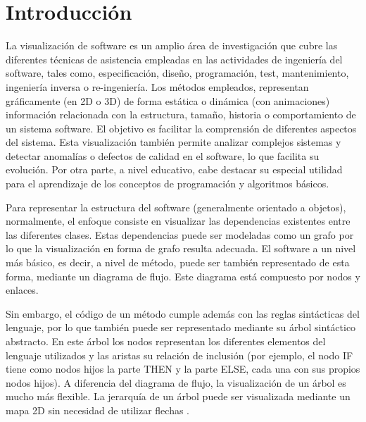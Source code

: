 \documentclass{llncs}
\begin{document}
\section{Introducción}
\label{sec:intro}
La visualización de software es un amplio área de investigación que cubre las diferentes técnicas de asistencia empleadas en las actividades de ingeniería del software, tales como, especificación, diseño, programación, test, mantenimiento, ingeniería inversa o re-ingeniería. Los métodos empleados, representan gráficamente (en 2D o 3D) de forma estática o dinámica (con animaciones) información relacionada con la estructura, tamaño, historia o comportamiento de un sistema software. El objetivo es facilitar la comprensión de diferentes aspectos del sistema. Esta visualización también permite analizar complejos sistemas y detectar anomalías o defectos de calidad en el software, lo que facilita su evolución. Por otra parte, a nivel educativo, cabe destacar su especial utilidad para el aprendizaje de los conceptos de programación y algoritmos básicos.

Para representar la estructura del software (generalmente orientado a objetos), normalmente, el enfoque consiste en visualizar las dependencias existentes entre las diferentes clases. Estas dependencias puede ser modeladas como un grafo por lo que la visualización en forma de grafo resulta adecuada. El software a un nivel más básico, es decir, a nivel de método, puede ser también representado de esta forma, mediante un diagrama de flujo. Este diagrama está compuesto por nodos y enlaces.

Sin embargo, el código de un método cumple además con las reglas sintácticas del lenguaje, por lo que también puede ser representado mediante su árbol sintáctico abstracto. En este árbol los nodos representan los diferentes elementos del lenguaje utilizados y las aristas su relación de inclusión (por ejemplo, el nodo IF tiene como nodos hijos la parte THEN y la parte ELSE, cada una con sus propios nodos hijos). A diferencia del diagrama de flujo, la visualización de un árbol es mucho más flexible. La jerarquía de un árbol puede ser visualizada mediante un mapa 2D sin necesidad de utilizar flechas \cite{softwarevisualization}.
\end{document}

